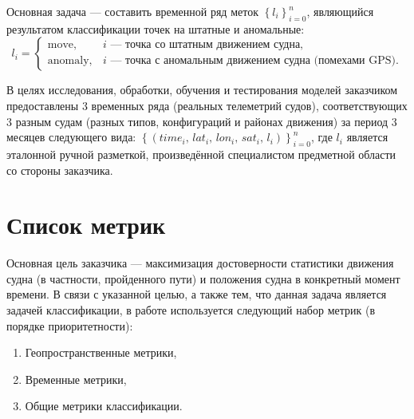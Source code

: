 \documentclass[a4paper,12pt]{report}
\begin{document}
	Основная задача --- составить временной ряд меток $\left\{l_i\right\}_{i=0}^{n}$, являющийся результатом классификации точек на штатные и аномальные:
	\[
	l_i =
	\begin{cases}
		\mathrm{move},   & \text{$i$ --- точка со штатным движением судна},\\
		\mathrm{anomaly}, & \text{$i$ --- точка с аномальным движением судна (помехами GPS)}.
	\end{cases}
	\]

	В целях исследования, обработки, обучения и тестирования моделей заказчиком предоставлены 3 временных ряда (реальных телеметрий судов), соответствующих 3 разным судам (разных типов, конфигураций и районах движения) за период 3 месяцев следующего вида:
	$\left\{\left(\mathit{time}_i,\, \mathit{lat}_i,\, \mathit{lon}_i,\, \mathit{sat}_i,\, l_i\right) \right\}_{i=0}^{n}$, где $l_i$ является эталонной ручной разметкой, произведённой специалистом предметной области со стороны заказчика.

	\section{Список метрик}
	Основная цель заказчика --- максимизация достоверности статистики движения судна (в частности, пройденного пути) и положения судна в конкретный момент времени. В связи с указанной целью, а также тем, что данная задача является задачей классификации, в работе используется следующий набор метрик (в порядке приоритетности):
	\begin{enumerate}
		\item Геопространственные метрики,
		\item Временные метрики,
		\item Общие метрики классификации.
	\end{enumerate}
\end{document}

